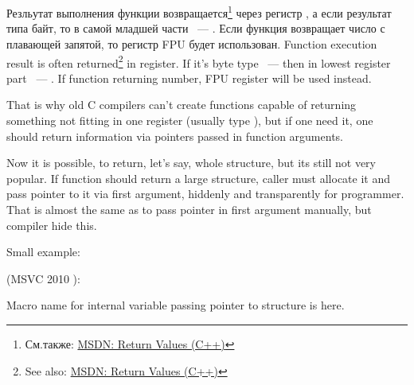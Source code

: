 ﻿\section{}

\newcommand{\MSDNURL}{\href{http://msdn.microsoft.com/en-us/library/7572ztz4.aspx}{MSDN: Return Values (C++)}}

\IFRU
{Резльутат выполнения функции возвращается\footnote{См.также: \MSDNURL} через регистр \EAX, а если результат типа байт, 
то в самой младшей части \EAX ~--- \AL. Если функция возвращает число с плавающей запятой, 
то регистр FPU \STZERO будет использован.}
{Function execution result is often returned\footnote{See also: \MSDNURL} in \EAX register. 
If it's byte type ~--- then in lowest register \EAX part ~--- \AL. If function returning \Tfloat number, FPU register 
\STZERO will be used instead.}

{That is why old C compilers can't create functions capable of returning something not fitting in one 
register (usually type \Tint), but if one need it, one should return information via pointers passed 
in function arguments.}
{Now it is possible, to return, let's say, whole structure, but its still not very popular. 
If function should return a large structure, caller must allocate it and pass pointer to it via first argument, 
hiddenly and transparently for programmer. 
That is almost the same as to pass pointer in first argument manually, but compiler hide this.

Small example:}



 (MSVC 2010 \Ox):



{Macro name for internal variable passing pointer to structure is  here.}

